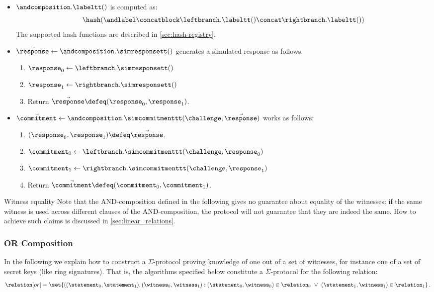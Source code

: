 \documentclass[11pt]{article}
\begin{document}
\begin{itemize}
\begin{enumerate}
    \end{enumerate}
  \item  $\andcomposition.\labeltt()$ is computed as:
    \[
     \hash(\andlabel \concatblock \leftbranch.\labeltt() \concat \rightbranch.\labeltt())
   \]
   The supported hash functions are described in \cref{sec:hash-registry}.
  \item
  $\vec \response \gets \andcomposition.\simresponsett()$
   generates a simulated response as follows:
    \begin{enumerate}
      \item
        $\response_0\gets\leftbranch.\simresponsett()$
        \item $\response_1\gets\rightbranch.\simresponsett()$
      \item
        Return $\vec \response\defeq(\response_0,\response_1)$.
    \end{enumerate}
  \item
  $\vec \commitment \gets \andcomposition.\simcommitmenttt(\challenge, \vec \response)$ works as follows:
    \begin{enumerate}
      \item
        $(\response_0,\response_1)\defeq\vec\response$.
      \item
        $\commitment_0\gets\leftbranch.\simcommitmenttt(\challenge,\response_0)$
        \item $\commitment_1\gets\rightbranch.\simcommitmenttt(\challenge,\response_1)$
      \item
        Return $\vec \commitment\defeq(\commitment_0, \commitment_1)$.
      \end{enumerate}
\end{itemize}

\begin{warning}{Witness equality}{}
  Note that the AND-composition defined in the following gives no guarantee about equality of the witnesses: if the same witness is used across different clauses of the AND-composition, the protocol will not guarantee that they are indeed the same.
	How to achieve such claims is discussed in \cref{sec:linear_relations}.
  \end{warning}

\subsubsection{OR Composition}

  In the following we explain how to construct a $\Sigma$-protocol proving knowledge of one out of a set of witnesses, for instance one of a set of secret keys (like ring signatures).
  That is, the algorithms specified below constitute a $\Sigma$-protocol for the following relation:
\[
  \relation[or] = \set{
    ((\statement_0,\statement_1),(\witness_0,\witness_1) :
    (\statement_0,\witness_0)\in \relation_0 ~\lor~ (\statement_1,\witness_1)\in\relation_1}\,.
\]
\end{document}
